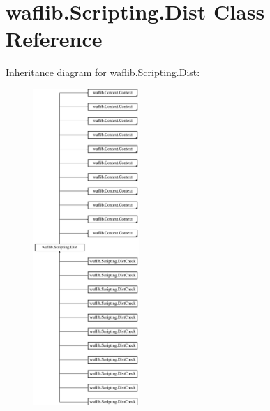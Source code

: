 \hypertarget{classwaflib_1_1_scripting_1_1_dist}{}\section{waflib.\+Scripting.\+Dist Class Reference}
\label{classwaflib_1_1_scripting_1_1_dist}
Inheritance diagram for waflib.\+Scripting.\+Dist\+:\begin{figure}[H]
\begin{center}
\leavevmode
\includegraphics[height=12.000000cm]{classwaflib_1_1_scripting_1_1_dist}
\end{center}
\end{figure}
